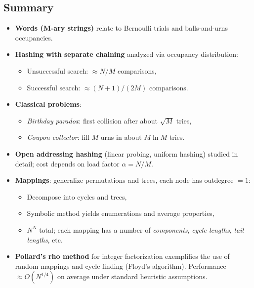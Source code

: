 \documentclass[11pt,letterpaper]{article}
\begin{document}
\subsection{Summary}
\begin{itemize}
  \item \textbf{Words (M-ary strings)} relate to Bernoulli trials and balls-and-urns occupancies.
  \item \textbf{Hashing with separate chaining} analyzed via occupancy distribution:
    \begin{itemize}
      \item Unsuccessful search: $\approx N/M$ comparisons,
      \item Successful search: $\approx (N+1)/(2M)$ comparisons.
    \end{itemize}
  \item \textbf{Classical problems}: 
    \begin{itemize}
      \item \emph{Birthday paradox}: first collision after about $\sqrt{M}$ tries,
      \item \emph{Coupon collector}: fill $M$ urns in about $M\ln M$ tries.
    \end{itemize}
  \item \textbf{Open addressing hashing} (linear probing, uniform hashing) studied in detail; cost depends on load factor $\alpha = N/M$.
  \item \textbf{Mappings}: generalize permutations and trees, each node has outdegree $=1$:
    \begin{itemize}
      \item Decompose into cycles and trees,
      \item Symbolic method yields enumerations and average properties,
      \item $N^N$ total; each mapping has a number of \emph{components}, \emph{cycle lengths}, \emph{tail lengths}, etc.
    \end{itemize}
  \item \textbf{Pollard's rho method} for integer factorization exemplifies the use of random mappings and cycle-finding (Floyd's algorithm). Performance $\approx O(N^{1/4})$ on average under standard heuristic assumptions.
\end{itemize}
\end{document}
